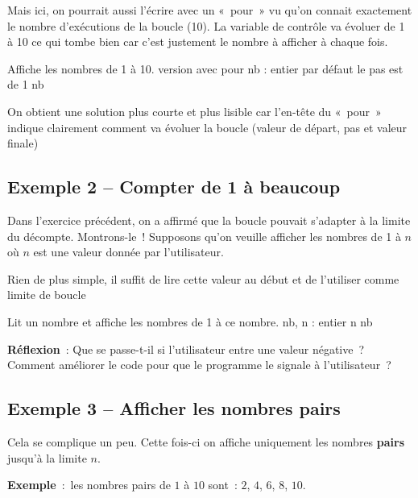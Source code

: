 		Mais ici, on pourrait aussi l’écrire avec un «~pour~» vu qu’on
		connait exactement le nombre d’exécutions de la boucle (10). 
		La variable de contrôle va évoluer de 1 à 10 ce qui tombe bien car
		c’est justement le nombre à afficher à chaque fois.

		\begin{Pseudocode}
		\LComment Affiche les nombres de 1 à 10.
		 \RComment version avec pour
			\Decl nb : entier
			 \RComment par défaut le pas est de 1
				\Write nb 
			\EndFor
		\EndModule
		\end{Pseudocode}

		On obtient une solution plus courte et plus lisible 
		car l’en-tête du «~pour~» indique clairement
		comment va évoluer la boucle
		(valeur de départ, pas et valeur finale)

	\subsection{Exemple 2 -- Compter de 1 à beaucoup}

		Dans l’exercice précédent, on a
		affirmé que la boucle pouvait s’adapter à la limite du
		décompte. Montrons-le~! Supposons qu’on veuille
		afficher les nombres de 1 à $n$ où $n$ est une valeur 
		donnée par l’utilisateur.

		Rien de plus simple, il suffit de lire cette
		valeur au début et de l’utiliser comme limite de boucle

		\begin{Pseudocode}
		\LComment Lit un nombre et affiche les nombres de 1 à ce nombre.
		\Module{afficherN}{}{} 
			\Decl nb, n : entier
			\Read n
			\For{nb \K{de} 1 \K{à} n} 
				\Write nb 
			\EndFor
		\EndModule
		\end{Pseudocode}

		\textbf{Réflexion}~: Que se passe-t-il si l’utilisateur entre une valeur négative~?
		Comment améliorer le code pour que le programme
		le signale à l’utilisateur~?

	\subsection{Exemple 3 -- Afficher les nombres pairs}

		Cela se complique un peu. Cette fois-ci on
		affiche uniquement les nombres \textbf{pairs} jusqu’à la limite $n$.
		
		\textbf{Exemple}~:~les nombres pairs de $1$ à $10$ sont~: $2$, $4$, $6$, $8$, $10$.
		
